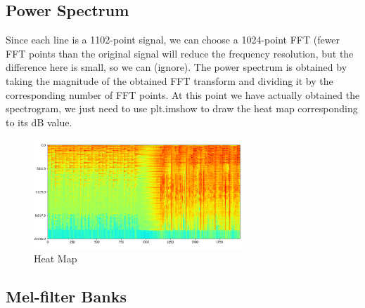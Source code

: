 \subsection{Power Spectrum}

Since each line is a 1102-point signal, we can choose a 1024-point FFT (fewer FFT points than the original signal will reduce the frequency resolution, but the difference here is small, so we can (ignore). The power spectrum is obtained by taking the magnitude of the obtained FFT transform and dividing it by the corresponding number of FFT points. At this point we have actually obtained the spectrogram, we just need to use plt.imshow to draw the heat map corresponding to its dB value.
\begin{figure}[!htbp]
	\centering
	\includegraphics[width = 0.7\textwidth]{figures_ning/audio_4.png}
	\caption[Heat Map]
	{ Heat Map}
	\label{fig:audio_4}
\end{figure}

\subsection{Mel-filter Banks}


